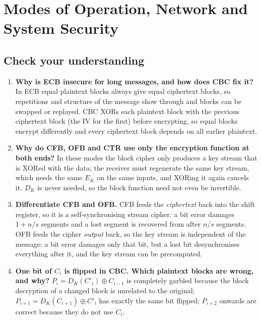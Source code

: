 \section{Modes of Operation, Network and System Security}\label{q:netsec}

\subsection*{Check your understanding}
\begin{enumerate}[leftmargin=1.6em,itemsep=3pt]
  \item \textbf{Why is ECB insecure for long messages, and how does CBC fix it?} In ECB equal plaintext blocks always give equal ciphertext blocks, so repetitions and structure of the message show through and blocks can be swapped or replayed. CBC XORs each plaintext block with the previous ciphertext block (the IV for the first) before encrypting, so equal blocks encrypt differently and every ciphertext block depends on all earlier plaintext.
  \item \textbf{Why do CFB, OFB and CTR use only the encryption function at both ends?} In these modes the block cipher only produces a key stream that is XORed with the data; the receiver must regenerate the same key stream, which needs the same $E_K$ on the same inputs, and XORing it again cancels it. $D_K$ is never needed, so the block function need not even be invertible.
  \item \textbf{Differentiate CFB and OFB.} CFB feeds the \emph{ciphertext} back into the shift register, so it is a self-synchronising stream cipher: a bit error damages $1 + n/s$ segments and a lost segment is recovered from after $n/s$ segments. OFB feeds the cipher \emph{output} back, so the key stream is independent of the message: a bit error damages only that bit, but a lost bit desynchronises everything after it, and the key stream can be precomputed.
  \item \textbf{One bit of $C_i$ is flipped in CBC. Which plaintext blocks are wrong, and why?} $P_i = D_K(C'_i) \oplus C_{i-1}$ is completely garbled because the block decryption of a changed block is unrelated to the original; $P_{i+1} = D_K(C_{i+1}) \oplus C'_i$ has exactly the same bit flipped; $P_{i+2}$ onwards are correct because they do not use $C_i$.

\end{enumerate}

